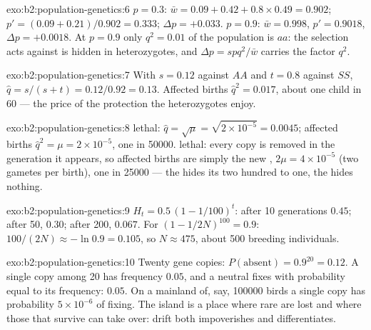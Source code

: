 \begin{solution}{exo:b2:population-genetics:6}
$p = 0.3$: $\bar w = 0.09 + 0.42 + 0.8\times 0.49 = 0.902$; $p' =
(0.09 + 0.21)/0.902 = 0.333$; $\Delta p = +0.033$. $p = 0.9$: $\bar w
= 0.998$, $p' = 0.9018$, $\Delta p = +0.0018$. At $p = 0.9$ only
$q^{2} = 0.01$ of the population is $aa$: the  selection acts
against is hidden in heterozygotes, and $\Delta p = spq^{2}/\bar w$
carries the factor $q^{2}$.
\end{solution}

\begin{solution}{exo:b2:population-genetics:7}
With $s = 0.12$ against $AA$ and $t = 0.8$ against $SS$, $\hat q =
s/(s + t) = 0.12/0.92 = 0.13$. Affected births $\hat q^{2} = 0.017$,
about one child in 60 --- the price of the protection the
heterozygotes enjoy.
\end{solution}

\begin{solution}{exo:b2:population-genetics:8}
 lethal: $\hat q = \sqrt{\mu} = \sqrt{2\times 10^{-5}} =
0.0045$; affected births $\hat q^{2} = \mu = 2\times 10^{-5}$, one in
\num{50000}.  lethal: every copy is removed in the
generation it appears, so affected births are simply the new
, $2\mu = 4\times 10^{-5}$ (two gametes per birth), one in
\num{25000} --- the  hides its  two hundred to one,
the  hides nothing.
\end{solution}

\begin{solution}{exo:b2:population-genetics:9}
$H_t = 0.5\,(1 - 1/100)^{t}$: after 10 generations $0.45$; after 50,
$0.30$; after 200, $0.067$. For $(1 - 1/2N)^{100} = 0.9$:
$100/(2N) \approx -\ln 0.9 = 0.105$, so $N \approx 475$, about 500
breeding individuals.
\end{solution}

\begin{solution}{exo:b2:population-genetics:10}
Twenty gene copies: $P(\text{absent}) = 0.9^{20} = 0.12$. A single
copy among 20 has frequency $0.05$, and a neutral  fixes with
probability equal to its frequency: $0.05$. On a mainland of, say,
\num{100000} birds a single copy has probability $5\times 10^{-6}$
of fixing. The island is a place where rare  are lost and
where those that survive can take over: drift both impoverishes and
differentiates.
\end{solution}


